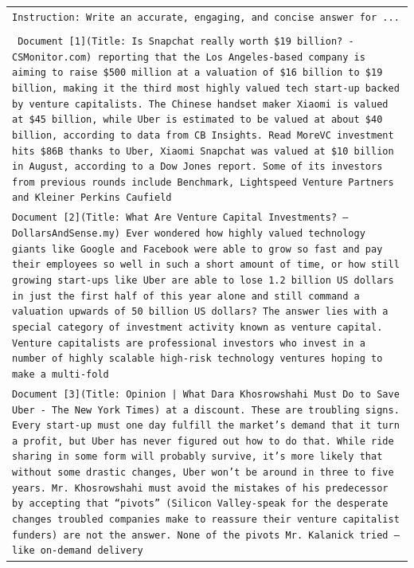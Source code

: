 \documentclass[11pt]{article}
\begin{document}
\begin{table}[h]
    \centering
    \small
    \begin{tabular}{>{\raggedright\arraybackslash\tt}p{}<{}}
        \toprule
            Instruction: Write an accurate, engaging, and concise answer for ... \\
            \\
            \vspace{-1em}
            Document [1](Title: Is Snapchat really worth \$19 billion? - CSMonitor.com) reporting that the Los Angeles-based company is aiming to raise \$500 million at a valuation of \$16 billion to \$19 billion, making it the third most highly valued tech start-up backed by venture capitalists. The Chinese handset maker Xiaomi is valued at \$45 billion, while Uber is estimated to be valued at about \$40 billion, according to data from CB Insights. Read MoreVC investment hits \$86B thanks to Uber, Xiaomi Snapchat was valued at \$10 billion in August, according to a Dow Jones report. Some of its investors from previous rounds include Benchmark, Lightspeed Venture Partners and Kleiner Perkins Caufield \\
            Document [2](Title: What Are Venture Capital Investments? – DollarsAndSense.my) Ever wondered how highly valued technology giants like Google and Facebook were able to grow so fast and pay their employees so well in such a short amount of time, or how still growing start-ups like Uber are able to lose 1.2 billion US dollars in just the first half of this year alone and still command a valuation upwards of 50 billion US dollars? The answer lies with a special category of investment activity known as venture capital. Venture capitalists are professional investors who invest in a number of highly scalable high-risk technology ventures hoping to make a multi-fold \\
            Document [3](Title: Opinion | What Dara Khosrowshahi Must Do to Save Uber - The New York Times) at a discount. These are troubling signs. Every start-up must one day fulfill the market’s demand that it turn a profit, but Uber has never figured out how to do that. While ride sharing in some form will probably survive, it’s more likely that without some drastic changes, Uber won’t be around in three to five years. Mr. Khosrowshahi must avoid the mistakes of his predecessor by accepting that “pivots” (Silicon Valley-speak for the desperate changes troubled companies make to reassure their venture capitalist funders) are not the answer. None of the pivots Mr. Kalanick tried — like on-demand delivery \\

\end{tabular}
\end{table}
\end{document}
